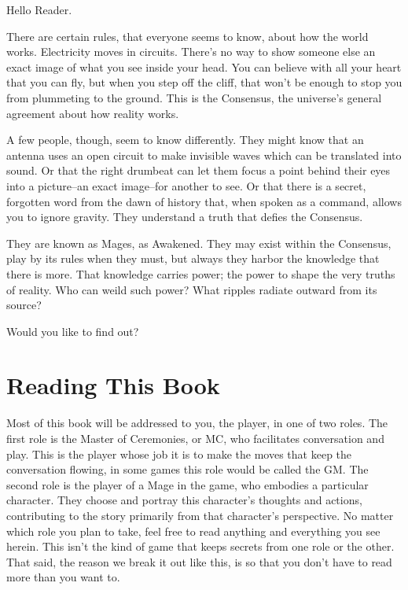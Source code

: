 \documentclass[
  oneside,
  statementpaper,
  9pt]{memoir}
\begin{document}
\begin{Narrator}

Hello Reader.

There are certain rules, that everyone seems to know, about how the world works. Electricity moves in circuits. There’s no way to show someone else an exact image of what you see inside your head. You can believe with all your heart that you can fly, but when you step off the cliff, that won't be enough to stop you from plummeting to the ground. This is the Consensus, the universe's general agreement about how reality works.

A few people, though, seem to know differently. They might know that an antenna uses an open circuit to make invisible waves which can be translated into sound. Or that the right drumbeat can let them focus a point behind their eyes into a picture--an exact image--for another to see. Or that there is a secret, forgotten word from the dawn of history that, when spoken as a command, allows you to ignore gravity. They understand a truth that defies the Consensus.

They are known as Mages, as Awakened. They may exist within the Consensus, play by its rules when they must, but always they harbor the knowledge that there is more. That knowledge carries power; the power to shape the very truths of reality. Who can weild such power? What ripples radiate outward from its source?

Would you like to find out?

\end{Narrator}

\hypertarget{reading-this-book}{%
\section{Reading This Book}\label{reading-this-book}}

Most of this book will be addressed to you, the player, in one of two
roles. The first role is the Master of Ceremonies, or MC, who
facilitates conversation and play. This is the player whose job it is to
make the moves that keep the conversation flowing, in some games this
role would be called the GM. The second role is the player of a Mage in
the game, who embodies a particular character. They choose and portray
this character's thoughts and actions, contributing to the story
primarily from that character's perspective. No matter which role you
plan to take, feel free to read anything and everything you see herein.
This isn't the kind of game that keeps secrets from one role or the
other. That said, the reason we break it out like this, is so that you
don't have to read more than you want to.
\end{document}
